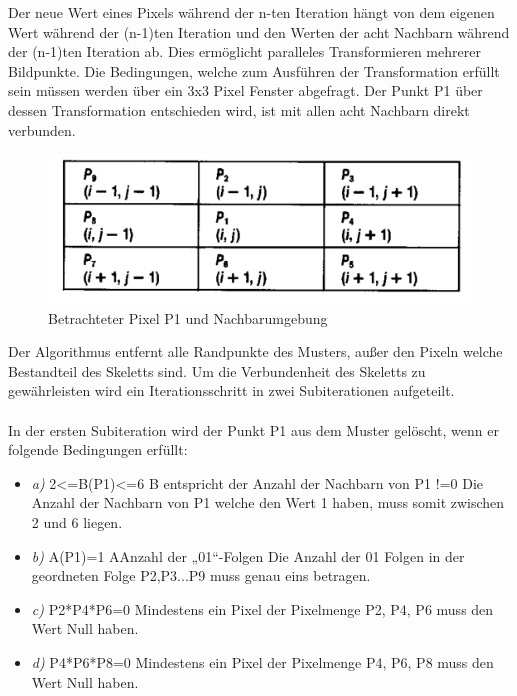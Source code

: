 Der neue Wert eines Pixels während der n-ten Iteration hängt von dem eigenen Wert während der (n-1)ten Iteration und den Werten der acht Nachbarn während der (n-1)ten Iteration ab. Dies ermöglicht paralleles Transformieren mehrerer Bildpunkte. 
Die Bedingungen, welche zum Ausführen der Transformation erfüllt sein müssen werden über ein 3x3 Pixel Fenster abgefragt. Der Punkt P1 über dessen Transformation entschieden wird, ist mit allen acht Nachbarn direkt verbunden.\\
\begin{figure}
\centering
\includegraphics[width=0.7\linewidth]{./Res/PixelNachbarschaft}
\caption{Betrachteter Pixel P1 und Nachbarumgebung}
\label{fig:PixelNachbarschaft}
\end{figure}
Der Algorithmus entfernt alle Randpunkte des Musters, außer den Pixeln welche Bestandteil des Skeletts sind. Um die Verbundenheit des Skeletts zu gewährleisten wird ein  Iterationsschritt in zwei Subiterationen aufgeteilt.\\\\
In der ersten Subiteration wird der Punkt P1 aus dem Muster gelöscht, wenn er folgende Bedingungen erfüllt:
\begin{itemize} 
\item \emph{a)} 2<=B(P1)<=6     
B entspricht der Anzahl der Nachbarn von P1 !=0
Die Anzahl der Nachbarn von P1 welche den Wert 1 haben, muss somit zwischen 2 und 6 liegen.
\item \emph{b)}  A(P1)=1
AAnzahl der „01“-Folgen 
Die Anzahl der 01 Folgen in der geordneten Folge P2,P3...P9 muss genau eins betragen.
\item \emph{c)}  P2*P4*P6=0  
Mindestens ein Pixel der Pixelmenge P2, P4, P6 muss den Wert Null haben.
\item \emph{d)}  P4*P6*P8=0
Mindestens ein Pixel der Pixelmenge P4, P6, P8 muss den Wert Null haben.
\end {itemize}
